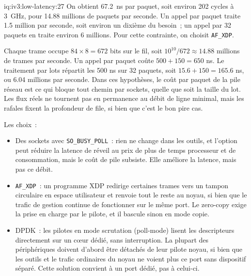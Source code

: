 \begin{solution}{iq:iv3:low-latency:27}
On obtient 67.2~ns par paquet, soit environ 202 cycles à 3~GHz, pour 14.88 millions de paquets par seconde. Un appel par paquet traite 1.5 million par seconde, soit environ un dixième du besoin~; un appel par 32 paquets en traite environ 6 millions. Pour cette contrainte, on choisit \texttt{AF\_XDP}.

Chaque trame occupe $84 \times 8 = 672$ bits sur le fil, soit $10^{10} / 672 \approx 14.88$ millions de trames par seconde. Un appel par paquet coûte $500 + 150 = 650$ ns. Le traitement par lots répartit les 500 ns sur 32 paquets, soit $15.6 + 150 = 165.6$ ns, ou 6.04 millions par seconde. Dans ces hypothèses, le coût par paquet de la pile réseau est ce qui bloque tout chemin par sockets, quelle que soit la taille du lot. Les flux réels ne tournent pas en permanence au débit de ligne minimal, mais les rafales fixent la profondeur de file, si bien que c'est le bon pire cas.

Les choix~:
\begin{itemize}
\item Des sockets avec \texttt{SO\_BUSY\_POLL}~: rien ne change dans les outils, et l'option peut réduire la latence de réveil au prix de plus de temps processeur et de consommation, mais le coût de pile subsiste. Elle améliore la latence, mais pas ce débit.
\item \texttt{AF\_XDP}~: un programme XDP redirige certaines trames vers un tampon circulaire en espace utilisateur et renvoie tout le reste au noyau, si bien que le trafic de gestion continue de fonctionner sur le même port. Le zero-copy exige la prise en charge par le pilote, et il bascule sinon en mode copie.
\item DPDK~: les pilotes en mode scrutation (poll-mode) lisent les descripteurs directement sur un cœur dédié, sans interruption. La plupart des périphériques doivent d'abord être détachés de leur pilote noyau, si bien que les outils et le trafic ordinaires du noyau ne voient plus ce port sans dispositif séparé. Cette solution convient à un port dédié, pas à celui-ci.
\end{itemize}

\end{solution}

